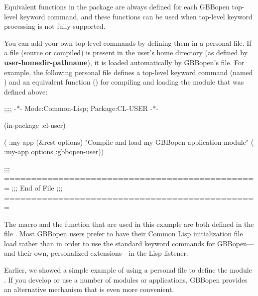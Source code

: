 \documentclass[10pt,twoside,english,pdftex]{article}
\begin{document}
Equivalent functions in the  package are always
defined for each GBBopen top-level keyword command, and these functions can be
used when top-level keyword processing is not fully supported.

%
%
%
%
%
You can add your own top-level commands by defining them in a personal
 file.  If a  file
(source or compiled) is present in the user's home directory (as defined by
\textbf{user-homedir-pathname}), it is loaded automatically by GBBopen's
 file.  For example, the following personal
 file defines a top-level keyword command
(named ) and an equivalent function () for
compiling and loading the  module that was defined above:

\begin{example}
  ;;;; -*- Mode:Common-Lisp; Package:CL-USER -*-

  (in-package :cl-user)

  ( :my-app (&rest options)
    "Compile and load my GBBopen application module"
    ( :my-app options :gbbopen-user))

  ;;; ===============================================
  ;;;   End of File
  ;;; ===============================================
\end{example}

The macro  and the function 
that are used in this example are both defined in the file
.  Most GBBopen users
prefer to have their Common Lisp initialization file load
 rather than
 in order to use the
standard keyword commands for GBBopen---and their own, personalized
extensions---in the Lisp listener.


%
%
%
%
%
Earlier, we showed a simple example of using a personal
 file to define the module .  If you
develop or use a number of modules or applications, GBBopen provides an
alternative mechanism that is even more convenient.
\end{document}
